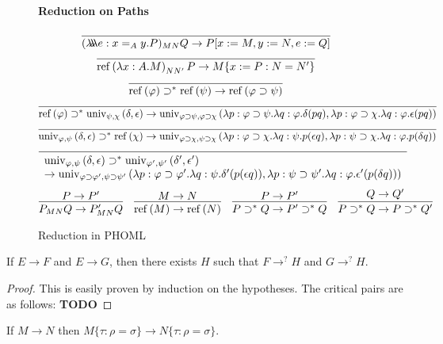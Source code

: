 \documentclass[a4paper,UKenglish]{lipics-v2016}
\newcommand*{\reff}[1]{\ensuremath{\mathrm{ref} \left( {#1} \right)}}
\newcommand*{\univ}[4]{\ensuremath{\mathrm{univ}_{{#1}, {#2}} \left({#3} , {#4} \right)}}
\newcommand*{\triplelambda}{\ensuremath{\lambda \!\! \lambda \!\! \lambda}}
\theoremstyle{plain}
\theoremstyle{definition}
\begin{document}
\begin{definition}
\begin{figure}
\paragraph*{Reduction on Paths}
$$\infer{(\triplelambda e:x =_A y.P)_{MN} Q \rightarrow P [x := M, y := N, e := Q]}{} $$
$$ \infer{\reff{\lambda x:A.M}_{N N'} P \rightarrow M \{ x:=P : N = N' \}}{} $$
$$ \infer{\reff{\varphi} \supset^* \reff{\psi} \rightarrow \reff{\varphi \supset \psi}}{} $$
$$ \infer{\reff{\varphi} \supset^* \univ{\psi}{\chi}{\delta}{\epsilon} \rightarrow 
\univ{\varphi \supset \psi}{\varphi \supset \chi}{\lambda p:\varphi \supset \psi. \lambda q : \varphi. \delta (pq)}{\lambda p : \varphi \supset \chi. \lambda q : \varphi. \epsilon (pq)}}{} $$
$$ \infer{\univ{\varphi}{\psi}{\delta}{\epsilon} \supset^* \reff{\chi} \rightarrow
\univ{\varphi \supset \chi}{\psi \supset \chi}{\lambda p : \varphi \supset \chi. \lambda q : \psi. p (\epsilon q)}{\lambda p:\psi \supset \chi. \lambda q : \varphi. p(\delta q)}}{} $$
$$ \infer{\begin{array}{l}
\univ{\varphi}{\psi}{\delta}{\epsilon} \supset^* \univ{\varphi'}{\psi'}{\delta'}{\epsilon'} \\
 \rightarrow
\univ{\varphi \supset \varphi'}{\psi \supset \psi'}{\lambda p : \varphi \supset \varphi'. \lambda q : \psi. \delta' (p(\epsilon q))}{\lambda p : \psi \supset \psi'. \lambda q : \varphi. \epsilon' (p (\delta q))}
\end{array}}{} $$
$$ \infer{P_{MN} Q \rightarrow P'_{MN} Q}{P \rightarrow P'} \quad
\infer{\reff{M} \rightarrow \reff{N}}{M \rightarrow N} \quad
\infer{P \supset^* Q \rightarrow P' \supset^* Q}{P \rightarrow P'} \quad
\infer{P \supset^* Q \rightarrow P \supset^* Q'}{Q \rightarrow Q'} $$
\caption{Reduction in PHOML}
\label{fig:reduction}
\end{figure}
\end{definition}

\begin{lemma}
\label{lm:diamond}
If $E \rightarrow F$ and $E \rightarrow G$, then there exists $H$ such that $F \rightarrow^? H$ and $G \rightarrow^? H$.
\end{lemma}

\begin{proof}
This is easily proven by induction on the hypotheses.  The critical pairs are as follows: \textbf{TODO}
\end{proof}

\begin{lemma}
\label{lm:resp-sub}
If $M \rightarrow N$ then $M \{ \tau : \rho = \sigma \} \rightarrow N \{ \tau : \rho = \sigma \}$.
\end{lemma}
\end{document}
